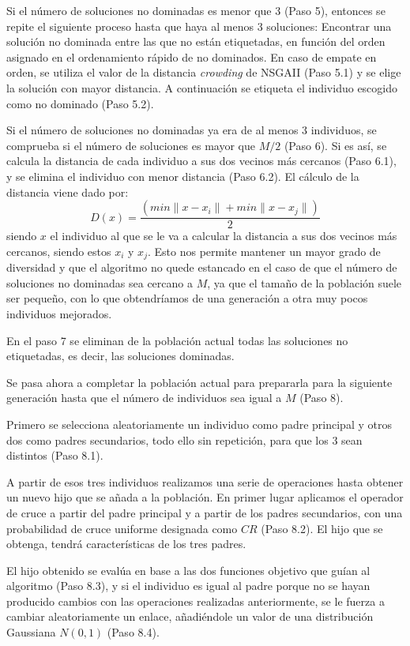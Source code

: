 Si el número de soluciones no dominadas es menor que 3 (Paso 5), entonces se repite el siguiente
proceso hasta que haya al menos 3 soluciones: Encontrar una solución no dominada
entre las que no están etiquetadas, en función del orden asignado en el ordenamiento
rápido de no dominados. En caso de empate en orden, se utiliza el valor de la distancia
\textit{crowding} de NSGAII (Paso 5.1) y se elige la solución con mayor distancia. A
continuación se
etiqueta el individuo escogido como no dominado (Paso 5.2).

Si el número de soluciones no dominadas ya era de al menos 3 individuos, se comprueba si
el número de soluciones es mayor que $M/2$ (Paso 6). Si es así, se calcula la distancia de
cada individuo a sus dos vecinos más cercanos (Paso 6.1), y se elimina el individuo con
menor distancia (Paso 6.2). El cálculo de la distancia viene dado por:
\begin{displaymath}
D(x)=\frac{(min\|x-x_{i}\|+min\|x-x_{j}\|)}{2}
\end{displaymath}
siendo $x$ el individuo al que se le va a calcular la distancia a sus dos vecinos más
cercanos, siendo estos $x_{i}$ y $x_{j}$. Esto nos permite mantener un mayor grado de
diversidad y que el algoritmo no quede estancado en el caso de que el número de
soluciones no dominadas sea cercano a $M$, ya que el tamaño de la población suele ser
pequeño, con lo que obtendríamos de una generación a otra muy pocos
individuos mejorados.

En el paso 7 se eliminan de la población actual todas las soluciones no etiquetadas, es
decir, las soluciones dominadas.

Se pasa ahora a completar la población actual para prepararla para la siguiente
generación hasta que el número de individuos sea igual a $M$ (Paso 8).

Primero se selecciona aleatoriamente un individuo como padre principal y otros dos como
padres secundarios, todo ello sin repetición, para que los 3 sean distintos (Paso 8.1).

A partir de esos tres individuos realizamos una serie de operaciones hasta
obtener un nuevo hijo que se añada a la población. En primer lugar aplicamos el operador
de cruce a partir del padre principal y a partir de los padres secundarios, con una
probabilidad de cruce uniforme designada como $CR$ (Paso 8.2). El hijo que se obtenga, tendrá
características de los tres padres.

El hijo obtenido se evalúa en base a las dos funciones objetivo que guían al algoritmo
(Paso 8.3), y si el individuo es igual al padre porque no se hayan producido cambios con
las operaciones realizadas anteriormente, se le fuerza a cambiar aleatoriamente un enlace,
añadiéndole un valor de una distribución Gaussiana $N(0,1)$ (Paso 8.4).

